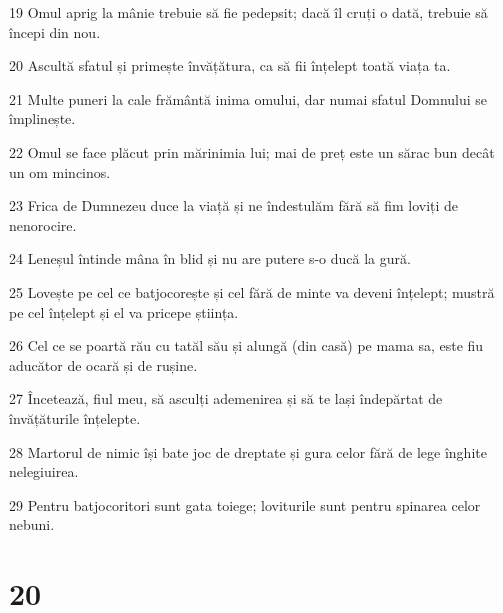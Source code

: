 \par 19 Omul aprig la mânie trebuie să fie pedepsit; dacă îl cruți o dată, trebuie să începi din nou.
\par 20 Ascultă sfatul și primește învățătura, ca să fii înțelept toată viața ta.
\par 21 Multe puneri la cale frământă inima omului, dar numai sfatul Domnului se împlinește.
\par 22 Omul se face plăcut prin mărinimia lui; mai de preț este un sărac bun decât un om mincinos.
\par 23 Frica de Dumnezeu duce la viață și ne îndestulăm fără să fim loviți de nenorocire.
\par 24 Leneșul întinde mâna în blid și nu are putere s-o ducă la gură.
\par 25 Lovește pe cel ce batjocorește și cel fără de minte va deveni înțelept; mustră pe cel înțelept și el va pricepe știința.
\par 26 Cel ce se poartă rău cu tatăl său și alungă (din casă) pe mama sa, este fiu aducător de ocară și de rușine.
\par 27 Încetează, fiul meu, să asculți ademenirea și să te lași îndepărtat de învățăturile înțelepte.
\par 28 Martorul de nimic își bate joc de dreptate și gura celor fără de lege înghite nelegiuirea.
\par 29 Pentru batjocoritori sunt gata toiege; loviturile sunt pentru spinarea celor nebuni.

\chapter{20}

